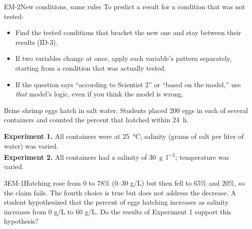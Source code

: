 \documentclass[11pt]{article}
\begin{document}
\begin{rulebox}{EM-2}{New conditions, same rules}
To predict a result for a condition that was not tested:
\begin{itemize}
\item Find the tested conditions that bracket the new one and stay between their results (ID-3).
\item If two variables change at once, apply each variable's pattern separately, starting from a condition that was actually tested.
\item If the question says ``according to Scientist 2'' or ``based on the model,'' use \emph{that} model's logic, even if you think the model is wrong.
\end{itemize}
\end{rulebox}

Brine shrimp eggs hatch in salt water. Students placed 200 eggs in each of several containers and counted the percent that hatched within \SI{24}{\hour}.

\textbf{Experiment 1.} All containers were at \SI{25}{\celsius}; salinity (grams of salt per liter of water) was varied.\\
\textbf{Experiment 2.} All containers had a salinity of \SI{30}{\gram\per\litre}; temperature was varied.

\begin{minipage}[t]{0.48\linewidth}
\end{minipage}\hfill
\begin{minipage}[t]{0.48\linewidth}
\end{minipage}
\passageend

\begin{q}{3}{EM-1}{Hatching rose from 0 to 78\% (0--30 g/L) but then fell to 65\% and 20\%, so the claim fails. The fourth choice is true but does not address the decrease.}
A student hypothesized that the percent of eggs hatching increases as salinity increases from 0 g/L to 60 g/L. Do the results of Experiment 1 support this hypothesis?
\end{q}
\end{document}
